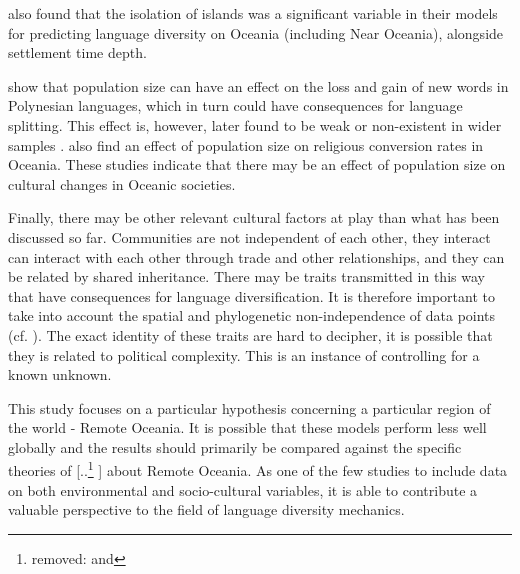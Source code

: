 \documentclass[unnumsec,webpdf,modern,medium]{oup-authoring-template}
\providecommand{\DIFaddtex}[1]{{\protect\color{blue} \sf #1}} %
\providecommand{\DIFdeltex}[1]{{\protect\color{red} [..\footnote{removed: #1} ]}} %
\providecommand{\DIFaddbegin}{} %
\providecommand{\DIFaddend}{} %
\providecommand{\DIFdelbegin}{} %
\providecommand{\DIFdelend}{} %
\providecommand{\DIFadd}[1]{\texorpdfstring{\DIFaddtex{#1}}{#1}} %
\providecommand{\DIFdel}[1]{\texorpdfstring{\DIFdeltex{#1}}{}} %
\newcommand{\DIFscaledelfig}{0.5}
\newlength{\DIFdelgraphicswidth} %
\newlength{\DIFdelgraphicsheight} %
\newcommand{\DIFaddincludegraphics}[2][]{{\color{blue}\fbox{\DIFOincludegraphics[#1]{#2}}}} %
\newcommand{\DIFdelincludegraphics}[2][]{%
\sbox{\DIFdelgraphicsbox}{\DIFOincludegraphics[#1]{#2}}%
\settoboxwidth{\DIFdelgraphicswidth}{\DIFdelgraphicsbox} %
\settoboxtotalheight{\DIFdelgraphicsheight}{\DIFdelgraphicsbox} %
\scalebox{\DIFscaledelfig}{%
\parbox[b]{\DIFdelgraphicswidth}{\usebox{\DIFdelgraphicsbox}\\[-\baselineskip] \rule{\DIFdelgraphicswidth}{0em}}\llap{\resizebox{\DIFdelgraphicswidth}{\DIFdelgraphicsheight}{%
\setlength{\unitlength}{\DIFdelgraphicswidth}%
\begin{picture}(1,1)%
\thicklines\linethickness{2pt} %
{\color[rgb]{1,0,0}\put(0,0){\framebox(1,1){}}}%
{\color[rgb]{1,0,0}\put(0,0){\line( 1,1){1}}}%
{\color[rgb]{1,0,0}\put(0,1){\line(1,-1){1}}}%
\end{picture}%
}\hspace*{3pt}}} %
} %
\DeclareRobustCommand{\DIFaddbegin}{\DIFOaddbegin \let\includegraphics\DIFaddincludegraphics} %
\DeclareRobustCommand{\DIFaddend}{\DIFOaddend \let\includegraphics\DIFOincludegraphics} %
\DeclareRobustCommand{\DIFdelbegin}{\DIFOdelbegin \let\includegraphics\DIFdelincludegraphics} %
\DeclareRobustCommand{\DIFdelend}{\DIFOaddend \let\includegraphics\DIFOincludegraphics} %
\begin{document}
\DIFaddbegin \DIFadd{\citet[4-5]{gavin2012island} also found that the isolation of islands was a significant variable in their models for predicting language diversity on Oceania (including Near Oceania), alongside settlement time depth. 
}

\DIFadd{\citet{bromham_polynesian_sizes} show that population size can have an effect on the loss and gain of new words in Polynesian languages, which in turn could have consequences for language splitting. This effect is, however, later found to be weak or non-existent in wider samples \citet{greenhill2018population}. \citet{watts_2018} also find an effect of population size on religious conversion rates in Oceania. These studies indicate that there may be an effect of population size on cultural changes in Oceanic societies.
}

\DIFadd{Finally, there may be other relevant cultural factors at play than what has been discussed so far. Communities are not independent of each other, they interact can interact with each other through trade and other relationships, and they can be related by shared inheritance. There may be traits transmitted in this way that have consequences for language diversification. It is therefore important to take into account the spatial and phylogenetic non-independence of data points (cf. \citet{roberts2015future} \citet{gavin2013toward}). The exact identity of these traits are hard to decipher, it is possible that they is related to political complexity. This is an instance of controlling for a known unknown.
}

\DIFaddend This study focuses on a particular hypothesis concerning a particular region of the world \DIFaddbegin \DIFadd{- Remote Oceania}\DIFaddend . It is possible that these models perform less well globally and the results should primarily be compared against the specific theories of \DIFdelbegin \DIFdel{\citet{lynch1981melanesian} and }\DIFdelend \citet{pawley81, pawley2007} about Remote Oceania. As one of the few studies to include data on both environmental and socio-cultural variables, it is able to contribute a valuable perspective to the field of language diversity mechanics.
\end{document}
